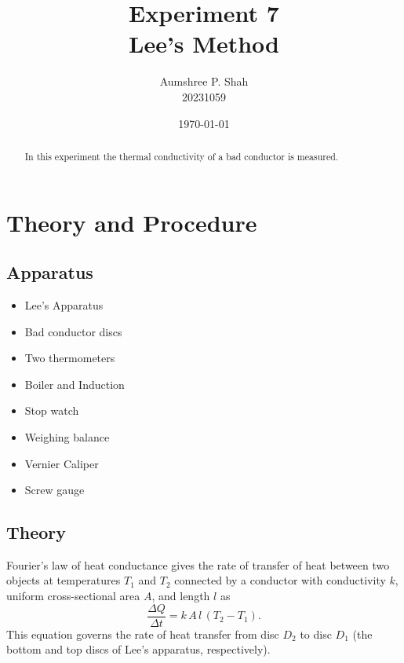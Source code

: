 \documentclass[%
 sor,
 jor,
 amsmath,amssymb,
 reprint,
]{revtex4-2}
\begin{document}
\title{Experiment 7\\Lee's Method}

\author{Aumshree P. Shah\\20231059}
\date{\today}

\begin{abstract}
\centering
In this experiment the thermal conductivity of a bad conductor is measured. 
\end{abstract}

\maketitle

\section{Theory and Procedure}
\subsection{Apparatus}
\small
\begin{minipage}{0.48\textwidth}
\begin{itemize}
\item Lee’s Apparatus \item Bad conductor discs \item Two thermometers \item Boiler and Induction 
\end{itemize}
\end{minipage}
\begin{minipage}{0.48\textwidth}
\begin{itemize}
	\item Stop watch \item Weighing balance \item Vernier Caliper \item Screw gauge
\end{itemize}
\end{minipage}
\subsection{Theory}
Fourier’s law of heat conductance gives the rate of transfer of heat between two objects at temperatures ${T_1}$ and ${T_2}$ connected by a conductor with conductivity $k$, uniform cross-sectional area $A$, and length $l$ as 
\[
\frac{\Delta Q}{\Delta t} = k\,A\,l\,\left({T_2}-{T_1}\right).
\]
This equation governs the rate of heat transfer from disc ${D_2}$ to disc ${D_1}$ (the bottom and top discs of Lee’s apparatus, respectively).\\
\end{document}
